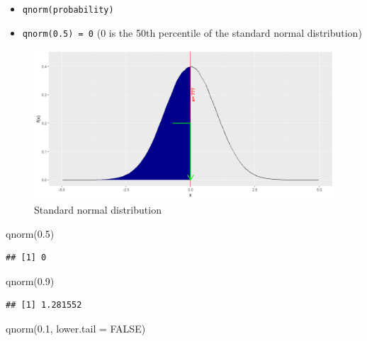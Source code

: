 \documentclass[
]{book}
\newenvironment{Shaded}{\begin{snugshade}}{\end{snugshade}}
\newcommand{\AttributeTok}[1]{\textcolor[rgb]{0.77,0.63,0.00}{#1}}
\newcommand{\ConstantTok}[1]{\textcolor[rgb]{0.00,0.00,0.00}{#1}}
\newcommand{\FloatTok}[1]{\textcolor[rgb]{0.00,0.00,0.81}{#1}}
\newcommand{\FunctionTok}[1]{\textcolor[rgb]{0.00,0.00,0.00}{#1}}
\newcommand{\NormalTok}[1]{#1}
\begin{document}
\begin{itemize}
\item
  \texttt{qnorm(probability)}
\item
  \texttt{qnorm(0.5)\ =\ 0} (0 is the 50th percentile of the standard normal distribution)
\end{itemize}

\begin{figure}

{\centering \includegraphics{figure/norm1b-1} 

}

\caption{Standard normal distribution}\label{fig:norm1b}
\end{figure}

\begin{Shaded}
\begin{Highlighting}[]
\FunctionTok{qnorm}\NormalTok{(}\FloatTok{0.5}\NormalTok{)}
\end{Highlighting}
\end{Shaded}

\begin{verbatim}
## [1] 0
\end{verbatim}

\begin{Shaded}
\begin{Highlighting}[]
\FunctionTok{qnorm}\NormalTok{(}\FloatTok{0.9}\NormalTok{)}
\end{Highlighting}
\end{Shaded}

\begin{verbatim}
## [1] 1.281552
\end{verbatim}

\begin{Shaded}
\begin{Highlighting}[]
\FunctionTok{qnorm}\NormalTok{(}\FloatTok{0.1}\NormalTok{, }\AttributeTok{lower.tail =} \ConstantTok{FALSE}\NormalTok{)}
\end{Highlighting}
\end{Shaded}
\end{document}

